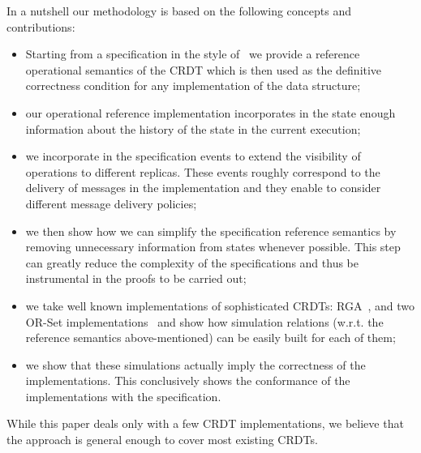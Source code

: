 

In a nutshell our methodology is based on the following concepts and
contributions:
\begin{itemize}[$\bullet$]
\item Starting from a specification in the style of~\cite{Burckhardt:2014}
  we provide a reference operational semantics of the CRDT which is
  then used as the definitive correctness condition for any
  implementation of the data structure;
\item our operational reference implementation incorporates in the
  state enough information about the history of the state in the
  current execution;
\item we incorporate in the specification events to extend the
  visibility of operations to different replicas. These events roughly
  correspond to the delivery of messages in the implementation and
  they enable to consider different message delivery policies;
\item we then show how we can simplify the specification reference
  semantics by removing unnecessary information from states whenever
  possible. 
  This step can greatly reduce the complexity of the specifications
  and thus be instrumental in the proofs to be carried out;
\item we take well known implementations of sophisticated CRDTs:
  RGA~\cite{RohJKL11}, and two OR-Set
  implementations~\cite{Shapiro:2011} and show how simulation relations
  (w.r.t. the reference semantics above-mentioned) can be easily built
  for each of them;
\item we show that these simulations actually imply the correctness of
  the implementations.
  This conclusively shows the conformance of the implementations with
  the specification.
\end{itemize}

While this paper deals only with a few CRDT implementations, we
believe that the approach is general enough to cover most existing
CRDTs.
%



